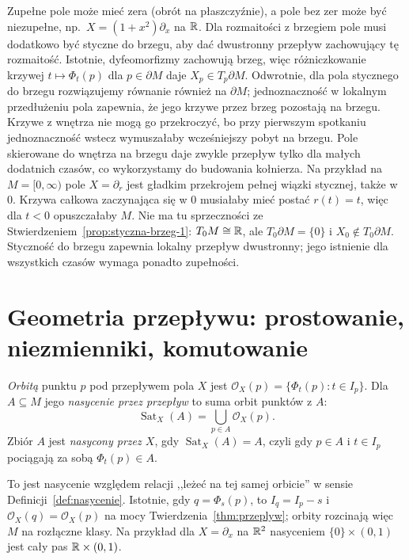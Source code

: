 \begin{uwaga}
Zupełne pole może mieć zera (obrót na płaszczyźnie), a pole bez zer
może być niezupełne, np.\ $X=(1+x^2)\partial_x$ na $\mathbb{R}$.
Dla rozmaitości z brzegiem pole musi dodatkowo być styczne do brzegu,
aby dać dwustronny przepływ zachowujący tę rozmaitość.
Istotnie, dyfeomorfizmy zachowują brzeg, więc różniczkowanie
krzywej $t\mapsto\Phi_t(p)$ dla $p\in\partial M$ daje
$X_p\in T_p\partial M$. Odwrotnie, dla pola stycznego do brzegu
rozwiązujemy równanie również na $\partial M$; jednoznaczność
w lokalnym przedłużeniu pola zapewnia, że jego krzywe przez
brzeg pozostają na brzegu. Krzywe z wnętrza nie mogą go
przekroczyć, bo przy pierwszym spotkaniu jednoznaczność wstecz
wymuszałaby wcześniejszy pobyt na brzegu.
Pole skierowane do wnętrza na brzegu daje zwykle przepływ tylko
dla małych dodatnich czasów, co wykorzystamy do budowania kołnierza.
Na przykład na $M=[0,\infty)$ pole $X=\partial_r$ jest gładkim
przekrojem pełnej wiązki stycznej, także w $0$.
Krzywa całkowa zaczynająca się w $0$ musiałaby mieć postać
$r(t)=t$, więc dla $t<0$ opuszczałaby $M$.
Nie ma tu sprzeczności ze Stwierdzeniem~\ref{prop:styczna-brzeg-1}:
$T_0M\cong\mathbb{R}$, ale $T_0\partial M=\{0\}$ i $X_0\notin T_0\partial M$.
Styczność do brzegu zapewnia lokalny przepływ dwustronny;
jego istnienie dla wszystkich czasów wymaga ponadto zupełności.
\end{uwaga}

\section{Geometria przepływu: prostowanie, niezmienniki, komutowanie}
\label{sec:prostowanie}

\begin{definicja}
\emph{Orbitą} punktu $p$ pod przepływem pola $X$ jest
$\mathcal O_X(p)=\{\Phi_t(p):t\in I_p\}$.
Dla $A\subseteq M$ jego \emph{nasycenie przez przepływ}
to suma orbit punktów z $A$:
\[
 \operatorname{Sat}_X(A)=\bigcup_{p\in A}\mathcal O_X(p).
\]
Zbiór $A$ jest \emph{nasycony przez $X$}, gdy
$\operatorname{Sat}_X(A)=A$, czyli gdy
$p\in A$ i $t\in I_p$ pociągają za sobą
$\Phi_t(p)\in A$.
\end{definicja}

To jest nasycenie względem relacji ,,leżeć na tej samej
orbicie'' w sensie Definicji~\ref{def:nasycenie}.
Istotnie, gdy $q=\Phi_s(p)$, to
$I_q=I_p-s$ i $\mathcal O_X(q)=\mathcal O_X(p)$
na mocy Twierdzenia~\ref{thm:przeplyw}; orbity rozcinają
więc $M$ na rozłączne klasy. Na przykład dla
$X=\partial_x$ na $\mathbb{R}^2$ nasyceniem
$\{0\}\times(0,1)$ jest cały pas $\mathbb{R}\times(0,1)$.

